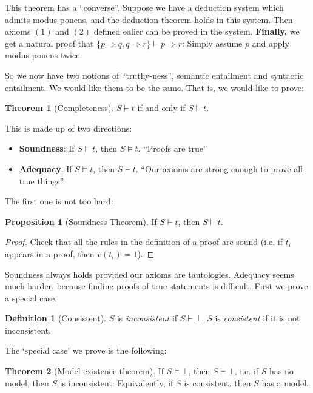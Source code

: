 \documentclass{article}
\theoremstyle{definition}
\newtheorem{definition}{Definition}
\newtheorem{proposition}{Proposition}
\newtheorem{theorem}{Theorem}
\numberwithin{definition}{section}
\newcommand{\entails}{\models}
\newcommand{\proves}{\vdash}
\begin{document}
  This theorem has a ``converse''.  Suppose we have a deduction system which 
admits modus ponens, and the deduction theorem holds in this system. Then 
axioms $(1)$ and $(2)$ defined ealier can be proved in the system. 
\textbf{Finally,} we get a natural proof that 
$\{p \Rightarrow q,q \Rightarrow r\} \proves p \Rightarrow r$: 
Simply assume $p$ and apply modus ponens twice. 

So we now have two notions of ``truthy-ness'', semantic entailment and 
syntactic entailment. We would like them to be the same. That is, we would 
like to prove:

\begin{theorem}[Completeness]
$S \proves t$ if and only if $S \entails t$. 
\end{theorem}

This is made up of two directions:
\begin{itemize}
  \item \textbf{Soundness}: If $S \proves t$, then $S \entails t$. 
    ``Proofs are true''
  \item \textbf{Adequacy}: If $S \entails t$, then $S \proves t$. 
    ``Our axioms are strong enough to prove all true things''.
\end{itemize}

The first one is not too hard:
\begin{proposition}[Soundness Theorem]
  If $S \proves t$, then $S \entails t$. 
\end{proposition}

\begin{proof}
Check that all the rules in the definition of a proof are sound 
  (i.e. if $t_{i}$ appears in a proof, then $v(t_{i})=1$). 
\end{proof}

  Soundness always holds provided our axioms are tautologies. 
Adequacy seems much harder, because finding proofs of true 
statements is difficult. First we prove a special case.

\begin{definition}[Consistent]
    $S$ is \textit{inconsistent} if $S \proves \bot$. 
    $S$ is \textit{consistent} if it is not inconsistent.
\end{definition}

The `special case' we prove is the following:
\begin{theorem}[Model existence theorem]
  If $S \entails \bot$, then $S \proves \bot$, i.e. if $S$ has no model, then 
  $S$ is inconsistent. Equivalently, if $S$ is consistent, then $S$ has a 
  model. 
\end{theorem}
\end{document}
